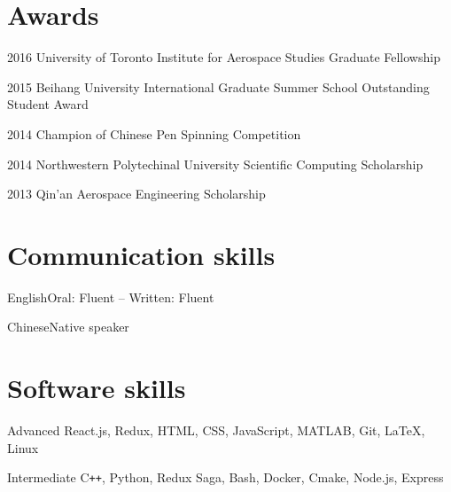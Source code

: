 \documentclass{tccv}
\begin{document}
\section{Awards}

\begin{factlist}
  \item{2016}
  {University of Toronto Institute for Aerospace Studies Graduate Fellowship}

  \item{2015}
  {Beihang University International Graduate Summer School Outstanding Student Award}

  \item{2014}
  {Champion of Chinese Pen Spinning Competition}

  \item{2014}
  {Northwestern Polytechinal University Scientific Computing Scholarship}

  \item{2013}
  {Qin'an Aerospace Engineering Scholarship}

\end{factlist}

\section{Communication skills}
\begin{factlist}
  \item{English}{Oral: Fluent -- Written: Fluent}
  \item{Chinese}{Native speaker}
\end{factlist}

\section{Software skills}
\begin{factlist}
  \item{Advanced}
  {React.js, Redux, HTML, CSS, JavaScript, MATLAB, Git, \LaTeX, Linux}

  \item{Intermediate}
  {C\texttt{++}, Python, Redux Saga, Bash, Docker, Cmake, Node.js, Express}
\end{factlist}
\end{document}
